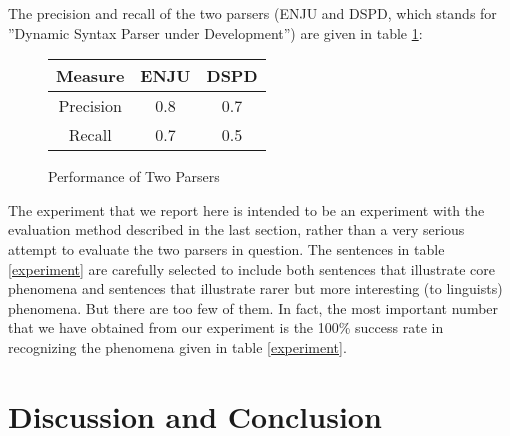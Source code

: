 \documentclass[11pt]{article}
\begin{document}
The precision and recall of the two parsers (ENJU and DSPD, which stands for ''Dynamic Syntax Parser under Development'')  are given in table \ref{result}:

\begin{figure}
\begin{tabular}{| c | c  | c |}
\hline
  Measure & ENJU & DSPD \\
\hline
  Precision & 0.8 & 0.7 \\
  Recall & 0.7 & 0.5 \\ 
\hline
\end{tabular}
\caption{Performance of Two Parsers}\label{result}
\end{figure}

The experiment that we report here is intended to be an experiment with the evaluation method described in the last section, rather than a very serious attempt to evaluate the two parsers in question. The sentences in table \ref{experiment} are carefully selected to include both sentences that illustrate core phenomena and sentences that illustrate rarer but more interesting (to linguists) phenomena. But there are too few of them. In fact, the most important number that we have obtained from our experiment is the 100\% success rate in recognizing the phenomena given in table \ref{experiment}.

\section{Discussion and Conclusion}
\end{document}
